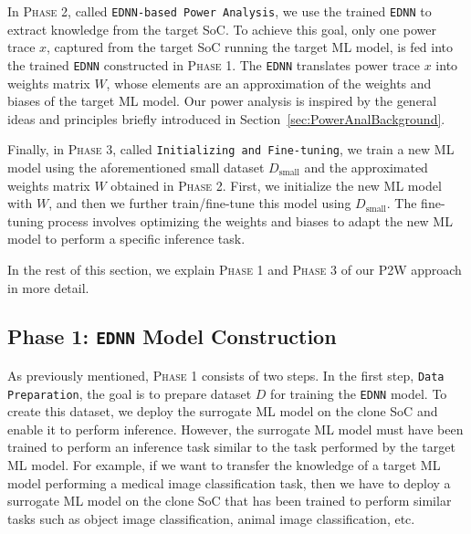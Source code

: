 \documentclass[letterpaper]{article}
\begin{document}
In \textsc{Phase 2}, called \texttt{EDNN-based Power Analysis}, we use the trained \texttt{EDNN} to extract knowledge from the target SoC. To achieve this goal, only one power trace $x$, captured from the target SoC running the target ML model, is fed into the trained \texttt{EDNN} constructed in \textsc{Phase 1}. The \texttt{EDNN} translates power trace $x$ into weights matrix $W$, whose elements are an approximation of the weights and biases of the target ML model. Our power analysis is inspired by the general ideas and principles briefly introduced in Section~\ref{sec:PowerAnalBackground}.

Finally, in \textsc{Phase 3}, called \texttt{Initializing and Fine-tuning}, we train a new ML model using the aforementioned small dataset $D_{\text{small}}$ and the approximated weights matrix $W$ obtained in \textsc{Phase 2}. First, we initialize the new ML model with $W$, and then we further train/fine-tune this model using $D_{\text{small}}$. The fine-tuning process involves optimizing the weights and biases to adapt the new ML model to perform a specific inference task.

In the rest of this section, we explain \textsc{Phase 1} and \textsc{Phase 3} of our P2W approach in more detail.

\subsection{Phase 1: \texttt{EDNN} Model Construction}
\label{sec:DataPrep}

As previously mentioned, \textsc{Phase 1} consists of two steps. In the first step, \texttt{Data Preparation}, the goal is to prepare dataset $D$ for training the \texttt{EDNN} model. To create this dataset, we deploy the surrogate ML model on the clone SoC and enable it to perform inference. However, the surrogate ML model must have been trained to perform an inference task similar to the task performed by the target ML model. For example, if we want to transfer the knowledge of a target ML model performing a medical image classification task, then we have to deploy a surrogate ML model on the clone SoC that has been trained to perform similar tasks such as object image classification, animal image classification, etc.
\end{document}
